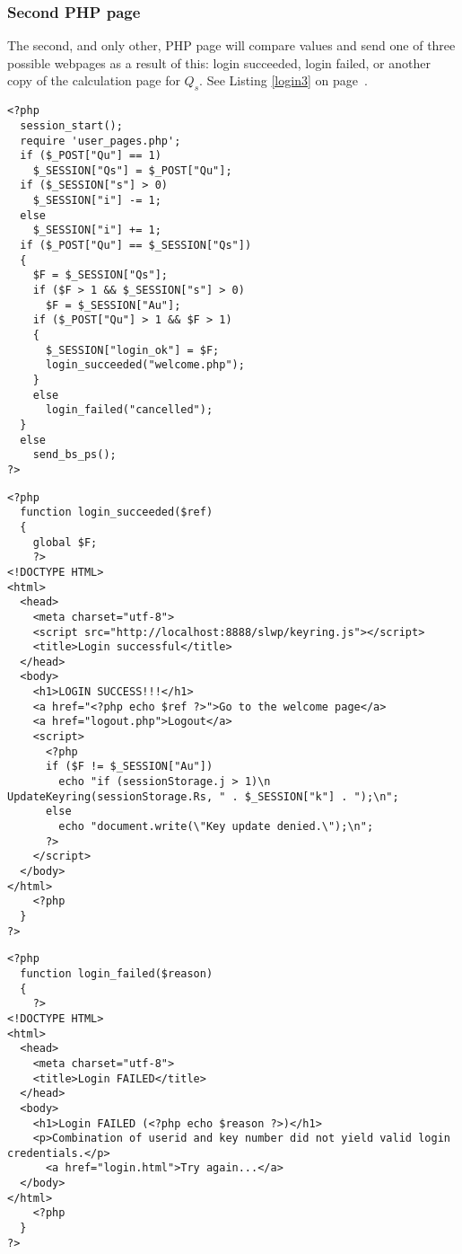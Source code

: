 \subsubsection{Second PHP page}
The second,
and only other,
PHP page will compare values and send one of three possible webpages as a result of this:
login succeeded,
login failed,
or another copy of the calculation page for $Q_s$.
See Listing \ref{login3} on page~\pageref{login3}.
\lstset{language=PHP}
\begin{lstlisting}[frame=lines,float=tbhp,label=login3,title=login3.php,caption=Final Login Page]
<?php
  session_start();
  require 'user_pages.php';
  if ($_POST["Qu"] == 1)
    $_SESSION["Qs"] = $_POST["Qu"];
  if ($_SESSION["s"] > 0)
    $_SESSION["i"] -= 1;
  else
    $_SESSION["i"] += 1;
  if ($_POST["Qu"] == $_SESSION["Qs"])
  {
    $F = $_SESSION["Qs"];
    if ($F > 1 && $_SESSION["s"] > 0)
      $F = $_SESSION["Au"];
    if ($_POST["Qu"] > 1 && $F > 1)
    {
      $_SESSION["login_ok"] = $F;
      login_succeeded("welcome.php");
    }
    else
      login_failed("cancelled");
  }
  else
    send_bs_ps();
?>
\end{lstlisting}
\lstset{language=PHP}
\begin{lstlisting}[frame=lines,float=tbhp,label=login_succeeded,title=user_pages.php,caption=login-succeeded]
<?php
  function login_succeeded($ref)
  {
    global $F;
    ?>
<!DOCTYPE HTML>
<html>
  <head>
    <meta charset="utf-8">
    <script src="http://localhost:8888/slwp/keyring.js"></script>
    <title>Login successful</title>
  </head>
  <body>
    <h1>LOGIN SUCCESS!!!</h1>
    <a href="<?php echo $ref ?>">Go to the welcome page</a>
    <a href="logout.php">Logout</a>
    <script>
      <?php
      if ($F != $_SESSION["Au"])
        echo "if (sessionStorage.j > 1)\n  UpdateKeyring(sessionStorage.Rs, " . $_SESSION["k"] . ");\n";
      else
        echo "document.write(\"Key update denied.\");\n";
      ?>
    </script>
  </body>
</html>
    <?php
  }
?>
\end{lstlisting}
\lstset{language=PHP}
\begin{lstlisting}[frame=lines,float=tbhp,label=login_failed,title=user_pages3.php,caption=login-failed]
<?php
  function login_failed($reason)
  {
    ?>
<!DOCTYPE HTML>
<html>
  <head>
    <meta charset="utf-8">
    <title>Login FAILED</title>
  </head>
  <body>
    <h1>Login FAILED (<?php echo $reason ?>)</h1>
    <p>Combination of userid and key number did not yield valid login credentials.</p>
      <a href="login.html">Try again...</a>
  </body>
</html>
    <?php
  }
?>
\end{lstlisting}
